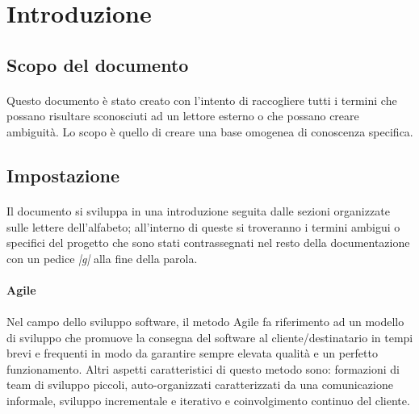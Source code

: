 \documentclass[10pt, a4paper]{article}
\title{\titolo}
\author{SWEetCode}
\begin{document}



\newpage

\tableofcontents
\newpage

\section{Introduzione}
\subsection{Scopo del documento}
\paragraph{}Questo documento è stato creato con l'intento di raccogliere tutti i termini che possano risultare sconosciuti ad un lettore esterno o che possano creare ambiguità. Lo scopo è quello di creare una base omogenea di conoscenza specifica. 

\subsection{Impostazione}
\paragraph{}Il documento si sviluppa in una introduzione seguita dalle sezioni organizzate sulle lettere dell'alfabeto; all'interno di queste si troveranno i termini ambigui o specifici del progetto che sono stati contrassegnati nel resto della documentazione con un pedice \textit{|g|} alla fine della parola.





\vspace{2em}
\paragraph{Agile}\noindent\hrulefill
\paragraph{}Nel campo dello sviluppo software, il metodo Agile fa riferimento ad un modello di sviluppo che promuove la consegna del software al cliente/destinatario in tempi brevi e frequenti in modo da garantire sempre elevata qualità e un perfetto funzionamento.
Altri aspetti caratteristici di questo metodo sono: formazioni di team di sviluppo piccoli, auto-organizzati caratterizzati da una comunicazione informale, sviluppo incrementale e iterativo e coinvolgimento continuo del cliente.
\end{document}
